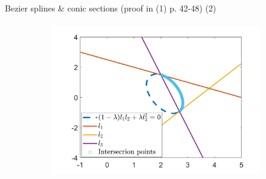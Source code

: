 \documentclass[aspectratio=169]{beamer}
\begin{document}
\begin{frame}[t]{Bezier splines \& conic sections (proof in (1) p. 42-48) (2)}
    \framesubtitle{}
    \vspace{-0.5cm}
        \begin{figure}[H]
            \centering\includegraphics[height=6.5cm,width=1\textwidth,keepaspectratio]{bezier_to_conic.png}
            \label{fig:bezier_to_conic.png}
        \end{figure}
    \end{frame}
\end{document}
